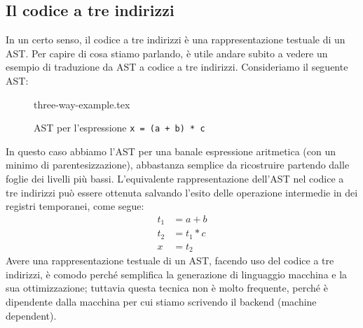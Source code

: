 \documentclass[class=book, crop=false, oneside, 12pt]{standalone}
\begin{document}
\subsection{Il codice a tre indirizzi}
In un certo senso, il codice a tre indirizzi è una rappresentazione testuale di un AST. Per capire di cosa stiamo parlando, è utile andare subito a vedere un esempio di traduzione da AST a codice a tre indirizzi. Consideriamo il seguente AST:
\begin{figure}[H]
    \centering
    {three-way-example.tex}
    \caption{AST per l'espressione \texttt{x = (a + b) * c}}
    \label{fig:ast-to-tac-ex1}
\end{figure}
In questo caso abbiamo l'AST per una banale espressione aritmetica (con un minimo di parentesizzazione), abbastanza semplice da ricostruire partendo dalle foglie dei livelli più bassi. L'equivalente rappresentazione dell'AST nel codice a tre indirizzi può essere ottenuta salvando l'esito delle operazione intermedie in dei registri temporanei, come segue:
\begin{align*}
    t_1 &= a + b \\
    t_2 &= t_1 * c \\
    x &= t_2
\end{align*}
Avere una rappresentazione testuale di un AST, facendo uso del codice a tre indirizzi, è comodo perché semplifica la generazione di linguaggio macchina e la sua ottimizzazione; tuttavia questa tecnica non è molto frequente, perché è dipendente dalla macchina per cui stiamo scrivendo il backend (machine dependent).
\end{document}

